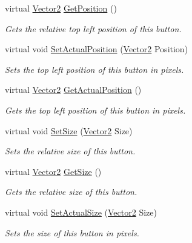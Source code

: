 \begin{DoxyCompactItemize}
virtual \hyperlink{classphys_1_1Vector2}{Vector2} \hyperlink{classphys_1_1UI_1_1TextButton_a09768e0666a109b7d35fd8b78240cfd3}{GetPosition} ()
\begin{DoxyCompactList}\small\item\em Gets the relative top left position of this button. \item\end{DoxyCompactList}\item 
virtual void \hyperlink{classphys_1_1UI_1_1TextButton_ab459720bb401b99ebc4a5287e36a91ee}{SetActualPosition} (\hyperlink{classphys_1_1Vector2}{Vector2} Position)
\begin{DoxyCompactList}\small\item\em Sets the top left position of this button in pixels. \item\end{DoxyCompactList}\item 
virtual \hyperlink{classphys_1_1Vector2}{Vector2} \hyperlink{classphys_1_1UI_1_1TextButton_ab406bec58bf6244c3e867fefd19d4d7f}{GetActualPosition} ()
\begin{DoxyCompactList}\small\item\em Gets the top left position of this button in pixels. \item\end{DoxyCompactList}\item 
virtual void \hyperlink{classphys_1_1UI_1_1TextButton_a04a27287b038220fa8183079c1a727ec}{SetSize} (\hyperlink{classphys_1_1Vector2}{Vector2} Size)
\begin{DoxyCompactList}\small\item\em Sets the relative size of this button. \item\end{DoxyCompactList}\item 
virtual \hyperlink{classphys_1_1Vector2}{Vector2} \hyperlink{classphys_1_1UI_1_1TextButton_a21f1ff24070711e5a42eae4eb54d02d6}{GetSize} ()
\begin{DoxyCompactList}\small\item\em Gets the relative size of this button. \item\end{DoxyCompactList}\item 
virtual void \hyperlink{classphys_1_1UI_1_1TextButton_ad83c81eda54a861b9e34b565027b8254}{SetActualSize} (\hyperlink{classphys_1_1Vector2}{Vector2} Size)
\begin{DoxyCompactList}\small\item\em Sets the size of this button in pixels. \item\end{DoxyCompactList}\item 

\end{DoxyCompactItemize}
